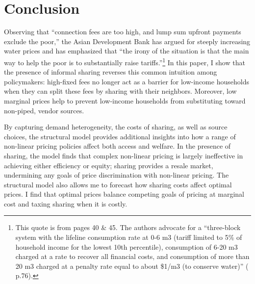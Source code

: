 \documentclass[12pt]{article}
\begin{document}
\section{Conclusion}\label{section:conclusion}


Observing that ``connection fees are too high, and lump sum upfront payments exclude the poor,'' the Asian Development Bank has argued for steeply increasing water prices and has emphasized that ``the irony of the situation is that the main way to help the poor is to substantially raise tariffs.''\footnote{This quote is from \cite{mcintosh2003asian} pages 40 \& 45.  The authors advocate for a ``three-block system with the lifeline consumption rate at 0-6 m3 (tariff limited to 5\% of household income for the lowest 10th percentile), consumption of 6-20 m3 charged at a rate to recover all financial costs, and consumption of more than 20 m3 charged at a penalty rate equal to about \$1/m3 (to conserve water)'' (\cite{mcintosh2003asian} p.76).}  In this paper, I show that the presence of informal sharing reverses this common intuition among policymakers: high-fixed fees no longer act as a barrier for low-income households when they can split these fees by sharing with their neighbors.  Moreover, low marginal prices help to prevent low-income households from substituting toward non-piped, vendor sources.  

By capturing demand heterogeneity, the costs of sharing, as well as source choices, the structural model provides additional insights into how a range of non-linear pricing policies affect both access and welfare.  In the presence of sharing, the model finds that complex non-linear pricing is largely ineffective in achieving either efficiency or equity; sharing provides a resale market, undermining any goals of price discrimination with non-linear pricing.  The structural model also allows me to forecast how sharing costs affect optimal prices.  I find that optimal prices balance competing goals of pricing at marginal cost and taxing sharing when it is costly.
\end{document}
